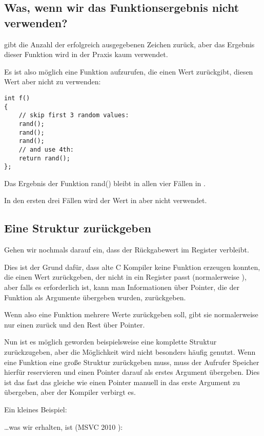 \subsection{Was, wenn wir das Funktionsergebnis nicht verwenden?}
\printf gibt die Anzahl der erfolgreich ausgegebenen Zeichen zurück, aber das Ergebnis dieser Funktion wird in der
Praxis kaum verwendet.

Es ist also möglich eine Funktion aufzurufen, die einen Wert zurückgibt, diesen Wert aber nicht zu verwenden:


\begin{lstlisting}[style=customc]
int f()
{
    // skip first 3 random values:
    rand();
    rand();
    rand();
    // and use 4th:
    return rand();
};
\end{lstlisting}
Das Ergebnis der Funktion rand() bleibt in allen vier Fällen in \EAX.

In den ersten drei Fällen wird der Wert in \EAX aber nicht verwendet.

\subsection{Eine Struktur zurückgeben}

Gehen wir nochmals darauf ein, dass der Rückgabewert im \EAX Register verbleibt.

Dies ist der Grund dafür, dass alte C Kompiler keine Funktion erzeugen konnten, die einen Wert zurückgeben, der nicht in
ein Register passt (normalerweise \Tint), aber falls es erforderlich ist, kann man Informationen über Pointer, die der
Funktion als Argumente übergeben wurden, zurückgeben.

Wenn also eine Funktion mehrere Werte zurückgeben soll, gibt sie normalerweise nur einen zurück und den Rest über
Pointer.

Nun ist es möglich geworden beispielsweise eine komplette Struktur zurückzugeben, aber die Möglichkeit wird nicht
besonders häufig genutzt. Wenn eine Funktion eine große Struktur zurückgeben muss, muss der Aufrufer Speicher hierfür
reservieren und einen Pointer darauf als erstes Argument übergeben.
Dies ist das fast das gleiche wie einen Pointer manuell in das erste Argument zu übergeben, aber der Kompiler verbirgt
es.

Ein kleines Beispiel:



\dots was wir erhalten, ist (MSVC 2010 \Ox):


